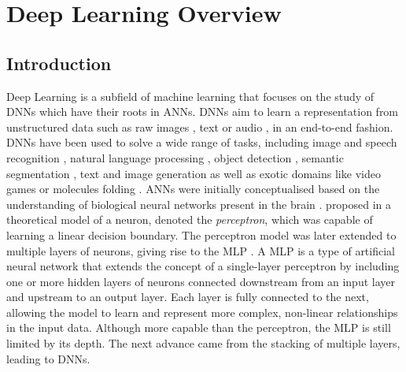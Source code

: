 \chapter{Deep Learning Overview}\label{chap:dlo}

\localtableofcontents

\section{Introduction}

Deep Learning is a subfield of machine learning that focuses on the study of
\acfp{DNN} which have their roots in \acfp{ANN}. \acp{DNN} aim to learn a
representation from unstructured data such as raw images
\cite{DBLP:conf/nips/KrizhevskySH12}, text
\cite{DBLP:conf/emnlp/BudzianowskiV19} or audio
\cite{DBLP:journals/corr/HannunCCCDEPSSCN14}, in an end-to-end fashion.
\acp{DNN} have been used to solve a wide range of tasks, including image and
speech recognition
\cite{DBLP:conf/nips/KrizhevskySH12,DBLP:journals/corr/SimonyanZ14a,DBLP:conf/cvpr/HeZRS16,DBLP:journals/corr/HannunCCCDEPSSCN14,DBLP:conf/icassp/ChanJLV16,DBLP:conf/icml/AmodeiABCCCCCCD16},
natural language processing
\cite{DBLP:conf/emnlp/BudzianowskiV19,DBLP:conf/naacl/DevlinCLT19,DBLP:conf/nips/VaswaniSPUJGKP17},
object detection \cite{DBLP:conf/cvpr/RedmonDGF16,DBLP:conf/nips/RenHGS15},
semantic segmentation \cite{long2015fully,DBLP:conf/cvpr/LiuCSAHY019}, text and
image generation
\cite{goodfellow2020generative,karras2019style,DBLP:conf/emnlp/BudzianowskiV19}
as well as exotic domains like video games
\cite{silver2016mastering,silver2018general} or molecules folding
\cite{jumper2021highly}. \acp{ANN} were initially conceptualised based on the
understanding of biological neural networks present in the brain
\cite{mcculloch1943logical,hebb2005organization}.
\citeauthor{rosenblatt1958perceptron} proposed in
\cite{rosenblatt1958perceptron} a theoretical model of a neuron, denoted the
\emph{perceptron}, which was capable of learning a linear decision boundary. The
perceptron model was later extended to multiple layers of neurons, giving rise
to the \acf{MLP} \cite{rosenblatt1961principles,rumelhart1986learning}. A
\acl{MLP} is a type of artificial neural network that extends the concept of a
single-layer perceptron by including one or more hidden layers of neurons
connected downstream from an input layer and upstream to an output layer. Each
layer is fully connected to the next, allowing the model to learn and represent
more complex, non-linear relationships in the input data. Although more capable
than the perceptron, the \ac{MLP} is still limited by its depth. The next
advance came from the stacking of multiple layers, leading to \aclp{DNN}.\\

